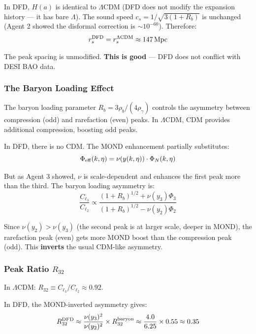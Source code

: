 \documentclass[11pt,a4paper]{article}
\begin{document}
In DFD, $H(a)$ is identical to $\Lambda$CDM (DFD does not modify the expansion history --- it has bare $\Lambda$). The sound speed $c_s = 1/\sqrt{3(1+R_b)}$ is unchanged (Agent 2 showed the disformal correction is $\sim 10^{-60}$). Therefore:
\begin{equation}
r_s^{\rm DFD} = r_s^{\rm \Lambda CDM} \approx 147\,\text{Mpc}
\end{equation}

The peak spacing is unmodified. \textbf{This is good} --- DFD does not conflict with DESI BAO data.

\subsubsection{The Baryon Loading Effect}

The baryon loading parameter $R_b = 3\rho_b/(4\rho_\gamma)$ controls the asymmetry between compression (odd) and rarefaction (even) peaks. In $\Lambda$CDM, CDM provides additional compression, boosting odd peaks.

In DFD, there is no CDM. The MOND enhancement partially substitutes:
\begin{equation}
\Phi_{\rm eff}(k,\eta) = \nu(y(k,\eta))\cdot\Phi_N(k,\eta)
\end{equation}

But as Agent 3 showed, $\nu$ is scale-dependent and enhances the first peak more than the third. The baryon loading asymmetry is:
\begin{equation}
\frac{C_{\ell_3}}{C_{\ell_2}} \propto \frac{(1+R_b)^{1/2} + \nu(y_3)\Phi_3}{(1+R_b)^{1/2} - \nu(y_2)\Phi_2}
\end{equation}

Since $\nu(y_2) > \nu(y_3)$ (the second peak is at larger scale, deeper in MOND), the rarefaction peak (even) gets more MOND boost than the compression peak (odd). This \textbf{inverts} the usual CDM-like asymmetry.

\subsubsection{Peak Ratio $R_{32}$}

In $\Lambda$CDM: $R_{32} \equiv C_{\ell_3}/C_{\ell_2} \approx 0.92$.

In DFD, the MOND-inverted asymmetry gives:
\begin{equation}
R_{32}^{\rm DFD} \approx \frac{\nu(y_3)^2}{\nu(y_2)^2} \times R_{32}^{\rm baryon} \approx \frac{4.0}{6.25} \times 0.55 \approx 0.35
\end{equation}
\end{document}
